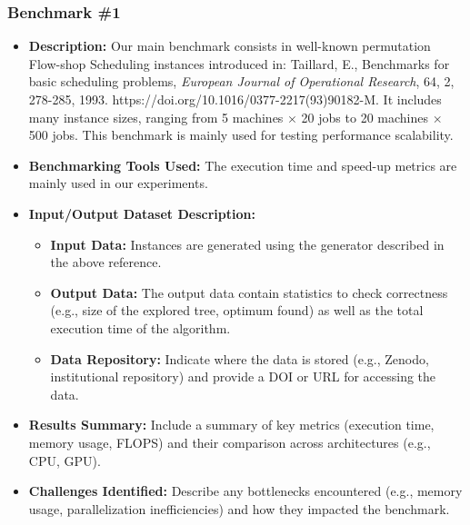\subsubsection{Benchmark \#1}
\begin{itemize}
    \item \textbf{Description:} Our main benchmark consists in well-known permutation Flow-shop Scheduling instances introduced in: Taillard, E., Benchmarks for basic scheduling problems, \textit{European Journal of Operational Research}, 64, 2, 278-285, 1993. https://doi.org/10.1016/0377-2217(93)90182-M. It includes many instance sizes, ranging from 5 machines $\times$ 20 jobs to 20 machines $\times$ 500 jobs. This benchmark is mainly used for testing performance scalability.
    \item \textbf{Benchmarking Tools Used:} The execution time and speed-up metrics are mainly used in our experiments.
    \item \textbf{Input/Output Dataset Description:}
        \begin{itemize}
            \item \textbf{Input Data:} Instances are generated using the generator described in the above reference.
            \item \textbf{Output Data:} The output data contain statistics to check correctness (e.g., size of the explored tree, optimum found) as well as the total execution time of the algorithm.
            \item \textbf{Data Repository:} Indicate where the data is stored (e.g., Zenodo, institutional repository) and provide a DOI or URL for accessing the data.
        \end{itemize}
    \item \textbf{Results Summary:} Include a summary of key metrics (execution time, memory usage, FLOPS) and their comparison across architectures (e.g., CPU, GPU).
    \item \textbf{Challenges Identified:} Describe any bottlenecks encountered (e.g., memory usage, parallelization inefficiencies) and how they impacted the benchmark.
\end{itemize}

